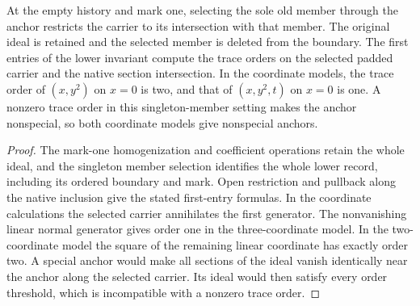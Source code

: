 \begin{theorem}
\label{hir:g1-positive-normal-mark-one-trace-orders}
\leanok
At the empty history and mark one, selecting the sole old
member through the anchor restricts the carrier to its
intersection with that member. The original ideal is retained
and the selected member is deleted from the boundary. The
first entries of the lower invariant compute the trace orders
on the selected padded carrier and the native section
intersection. In the coordinate models, the trace order of
$(x,y^2)$ on $x=0$ is two, and that of $(x,y^2,t)$ on $x=0$
is one. A nonzero trace order in this singleton-member
setting makes the anchor nonspecial, so both coordinate
models give nonspecial anchors.
\end{theorem}
\begin{proof}
The mark-one homogenization and coefficient operations
retain the whole ideal, and the singleton member selection
identifies the whole lower record, including its ordered
boundary and mark. Open restriction and pullback along the
native inclusion give the stated first-entry formulas. In
the coordinate calculations the selected carrier annihilates
the first generator. The nonvanishing linear normal
generator gives order one in the three-coordinate model.
In the two-coordinate model the square of the remaining
linear coordinate has exactly order two.
A special anchor would make all sections of the ideal
vanish identically near the anchor along the selected
carrier. Its ideal would then satisfy every order threshold,
which is incompatible with a nonzero trace order.
\end{proof}

